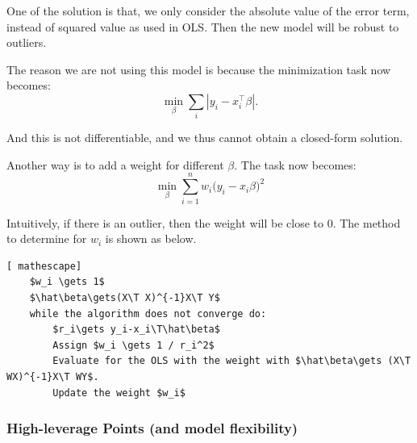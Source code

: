 \documentclass{article}
\theoremstyle{MyNonumberplain}
\theoremstyle{break}
\newcommand{\T}{^\intercal}
\theoremstyle{break}
\theoremstyle{break}
\theoremstyle{break}
\begin{document}
\begin{center}
\end{center}
    
One of the solution is that, we only consider the absolute value of the error term, instead of squared value as used in OLS.
Then the new model will be robust to outliers.

The reason we are not using this model is because the minimization task now becomes:
$$\min_\beta\sum_i|y_i-x_i\T\beta|.$$

And this is not differentiable, and we thus cannot obtain a closed-form solution. 

Another way is to add a weight for different $\beta$. The task now becomes:
$$\min_\beta\sum_{i=1}^nw_i\bigl(y_i-x_i\beta\bigr)^2$$

Intuitively, if there is an outlier, then the weight will be close to 0. The method to determine for $w_i$ is shown as below.

\begin{lstlisting}[ mathescape]
    $w_i \gets 1$
    $\hat\beta\gets(X\T X)^{-1}X\T Y$
    while the algorithm does not converge do:
        $r_i\gets y_i-x_i\T\hat\beta$
        Assign $w_i \gets 1 / r_i^2$
        Evaluate for the OLS with the weight with $\hat\beta\gets (X\T WX)^{-1}X\T WY$.
        Update the weight $w_i$
\end{lstlisting}

\subsubsection{High-leverage Points (and model flexibility)}
\end{document}
